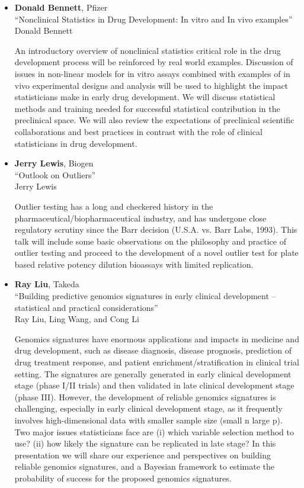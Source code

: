 \begin{itemize}
\item \textbf{Donald Bennett}, Pfizer \\
``Nonclinical Statistics in Drug Development: In vitro and In vivo examples'' \\
Donald Bennett


An introductory overview of nonclinical statistics critical role in the drug development process will be reinforced by real world examples.  Discussion of issues in non-linear models for in vitro assays combined with examples of in vivo experimental designs and analysis will be used to highlight the impact statisticians make in early drug development.  We will discuss statistical methods and training needed for successful statistical contribution in the preclinical space.  We will also review the expectations of preclinical scientific collaborations and best practices in contrast with the role of clinical statisticians in drug development.

\item \textbf{Jerry Lewis}, Biogen \\
``Outlook on Outliers'' \\
Jerry Lewis


Outlier testing has a long and checkered history in the pharmaceutical/biopharmaceutical industry, and has undergone close regulatory scrutiny since the Barr decision (U.S.A. vs. Barr Labs, 1993).  This talk will include some basic observations on the philosophy and practice of outlier testing and proceed to the development of a novel outlier test for plate based relative potency dilution bioassays with limited replication.

\item \textbf{Ray Liu}, Takeda \\
``Building predictive genomics signatures in early clinical development – statistical and practical considerations'' \\
Ray Liu, Ling Wang, and Cong Li


Genomics signatures have enormous applications and impacts in medicine and drug development, such as disease diagnosis, disease prognosis, prediction of drug treatment response, and patient enrichment/stratification in clinical trial setting. The signatures are generally generated in early clinical development stage (phase I/II trials) and then validated in late clinical development stage (phase III).  However, the development of reliable genomics signatures is challenging, especially in early clinical development stage, as it frequently involves high-dimensional data with smaller sample size (small n large p). Two major issues statisticians face are (i) which variable selection method to use? (ii) how likely the signature can be replicated in late stage? In this presentation we will share our experience and perspectives on building reliable genomics signatures, and a Bayesian framework to estimate the probability of success for the proposed genomics signatures.


\end{itemize}
